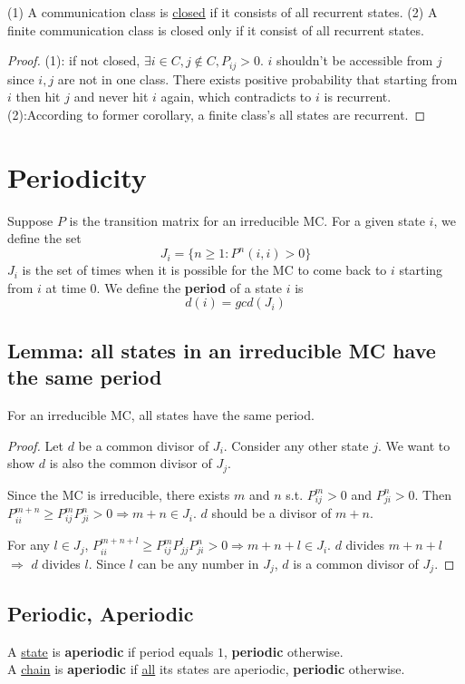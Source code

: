 \documentclass[11pt]{elegantbook}
\begin{document}
\begin{lemma}
    (1) A communication class is \underline{closed} if it consists of all recurrent states.
    (2) A finite communication class is closed only if it consist of all recurrent states.
\end{lemma}
\begin{proof}
(1): if not closed, $\exists i\in C,j\notin C, P_{ij}>0$. $i$ shouldn't be accessible from $j$ since $i,j$ are not in one class. There exists positive probability that starting from $i$ then hit $j$ and never hit $i$ again, which contradicts to $i$ is recurrent. (2):According to former corollary, a finite class's all states are recurrent.
\end{proof}

\section{Periodicity}
Suppose $P$ is the transition matrix for an irreducible MC. For a given state $i$, we define the set $$J_i=\{n\geq 1:P^n(i,i)>0\}$$
$J_i$ is the set of times when it is possible for the MC to come back to $i$ starting from $i$ at time $0$. We define the \textbf{period} of a state $i$ is $$d(i)=gcd(J_i)$$
\subsection{Lemma: all states in an irreducible MC have the same period}
\begin{lemma}
    For an irreducible MC, all states have the same period.
\end{lemma}
\begin{proof}
    Let $d$ be a common divisor of $J_i$. Consider any other state $j$. We want to show $d$ is also the common divisor of $J_j$.
    
    Since the MC is irreducible, there exists $m$ and $n$ s.t. $P_{ij}^m>0$ and $P_{ji}^n>0$. Then $P_{ii}^{m+n}\geq P_{ij}^mP_{ji}^n >0 \Rightarrow m+n\in J_i$. $d$ should be a divisor of $m+n$.

    For any $l\in J_j$, $P_{ii}^{m+n+l}\geq P_{ij}^mP_{jj}^lP_{ji}^n >0 \Rightarrow m+n+l\in J_i$. $d$ divides $m+n+l$ $\Rightarrow$ $d$ divides $l$. Since $l$ can be any number in $J_j$, $d$ is a common divisor of $J_j$.
\end{proof}

\subsection{Periodic, Aperiodic}
A \underline{state} is \textbf{aperiodic} if period equals $1$, \textbf{periodic} otherwise.\\
A \underline{chain} is \textbf{aperiodic} if \underline{all} its states are aperiodic, \textbf{periodic} otherwise.
\end{document}
